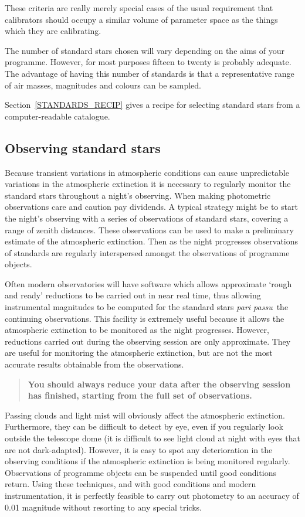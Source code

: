 \documentclass[twoside,11pt,nolof]{starlink}
\begin{document}
These criteria are really merely special cases of the usual requirement
that calibrators should occupy a similar volume of parameter space as
the things which they are calibrating.

The number of standard stars chosen will vary depending on the aims of
your programme.  However, for most purposes fifteen to twenty is
probably adequate.  The advantage of having this number of standards
is that a representative range of air masses, magnitudes and colours
can be sampled.

Section~\ref{STANDARDS_RECIP} gives a recipe for selecting standard
stars from a computer-readable catalogue.

\subsection{Observing standard stars}

Because transient variations in atmospheric conditions can cause
unpredictable variations in the atmospheric extinction it is necessary
to regularly monitor the standard stars throughout a night's observing.
When making photometric observations care and caution pay dividends.  A
typical strategy might be to start the night's observing with a series
of observations of standard stars, covering a range of zenith distances.
These observations can be used to make a preliminary estimate of the
atmospheric extinction.  Then as the night progresses observations of
standards are regularly interspersed amongst the observations of
programme objects.

Often modern observatories will have software which allows approximate
`rough and ready' reductions to be carried out in near real time, thus
allowing instrumental magnitudes to be computed for the standard stars
\textit{pari passu}\, the continuing observations.  This facility is extremely
useful because it allows the atmospheric extinction to be monitored as the
night progresses.  However, reductions carried out during the observing
session are only approximate.  They are useful for monitoring the
atmospheric extinction, but are not the most accurate results
obtainable from the observations.

\begin{quote}
\textbf{You should always reduce your data after the observing session
has finished, starting from the full set of observations.}
\end{quote}

Passing clouds and light mist will obviously affect the atmospheric
extinction.  Furthermore, they can be difficult to detect by eye, even
if you regularly look outside the telescope dome (it is difficult to see
light cloud at night with eyes that are not dark-adapted).  However, it
is easy to spot any deterioration in the observing conditions if the
atmospheric extinction is being monitored regularly.  Observations of
programme objects can be suspended until good conditions return.  Using
these techniques, and with good conditions and modern instrumentation,
it is perfectly feasible to carry out photometry to an accuracy of 0.01
magnitude without resorting to any special tricks.
\end{document}
